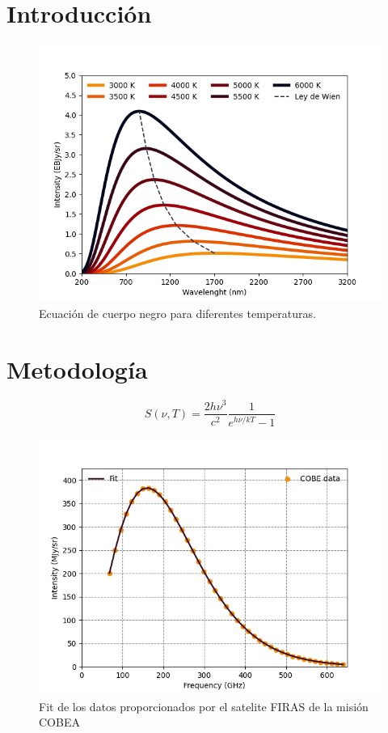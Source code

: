 \documentclass[12pt,letterpaper]{article}
\begin{document}
\begin{multicols}{2}
\section*{Introducción}
\begin{figure}[H]
    \hspace{-0.5cm}
    \includegraphics[scale=0.5]{../Graphics/black_body.png}
    \caption{Ecuación de cuerpo negro para diferentes temperaturas.}
    \label{black_body}
\end{figure}
\section*{Metodología}
\begin{equation}
S(\nu,T)= \frac{2h\nu^3}{c^2} \frac{1}{e^{h\nu/kT}-1}
\label{body equation}
\end{equation}
\begin{figure}[H]
\includegraphics[scale=0.45]{../Graphics/fit.png}
\caption{Fit de los datos proporcionados por el satelite FIRAS de la misión COBEA}
\end{figure}

\end{multicols}
\end{document}
